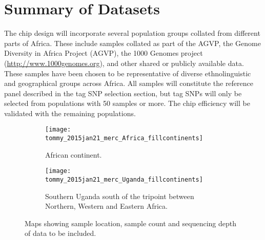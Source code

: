 \section{Summary of Datasets}
The chip design will incorporate several population groups collated from different parts of Africa. These include samples collated as part of the AGVP, the Genome Diversity in Africa Project (AGVP), the 1000 Genomes project (\href{http://www.1000genomes.org}{http://www.1000genomes.org}),
 and other shared or publicly available data. These samples have been chosen to be representative of diverse ethnolinguistic and geographical groups across Africa. All samples will constitute the reference panel described in the tag SNP selection section, but tag SNPs will only be selected from populations with 50 samples or more. The chip efficiency will be validated with the remaining populations.

\begin{figure}[h]
\begin{subfigure}{.5\textwidth}
  \centering
  \texttt{[image: tommy\_2015jan21\_merc\_Africa\_fillcontinents]}
  \caption{African continent.}
\end{subfigure}%
\begin{subfigure}{.5\textwidth}
  \centering
  \texttt{[image: tommy\_2015jan21\_merc\_Uganda\_fillcontinents]}
  \caption{Southern Uganda south of the tripoint between Northern, Western and Eastern Africa.}
\end{subfigure}%
\caption{Maps showing sample location, sample count and sequencing depth of data to be included.}
\end{figure}

